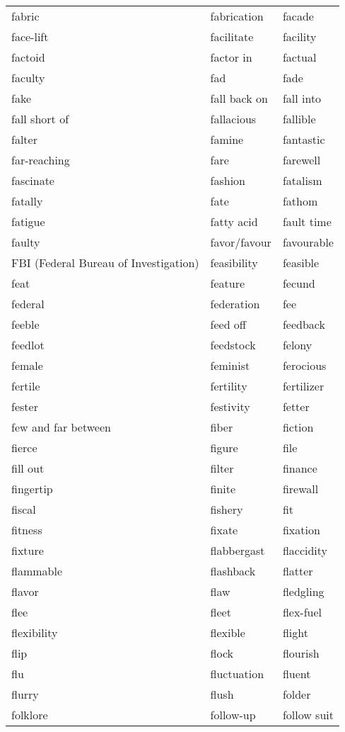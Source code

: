 \documentclass{minimal}
\begin{document}
\begin{longtable}{p{2.8cm}p{2.8cm}p{2.8cm}}
fabric & fabrication & facade \\
face-lift & facilitate & facility \\
factoid & factor in & factual \\
faculty & fad & fade \\
fake & fall back on & fall into \\
fall short of & fallacious & fallible \\
falter & famine & fantastic \\
far-reaching & fare & farewell \\
fascinate & fashion & fatalism \\
fatally & fate & fathom \\
fatigue & fatty acid & fault time \\
faulty & favor/favour & favourable \\
FBI (Federal Bureau of Investigation) & feasibility & feasible \\
feat & feature & fecund \\
federal & federation & fee \\
feeble & feed off & feedback \\
feedlot & feedstock & felony \\
female & feminist & ferocious \\
fertile & fertility & fertilizer \\
fester & festivity & fetter \\
few and far between & fiber & fiction \\
fierce & figure & file \\
fill out & filter & finance \\
fingertip & finite & firewall \\
fiscal & fishery & fit \\
fitness & fixate & fixation \\
fixture & flabbergast & flaccidity \\
flammable & flashback & flatter \\
flavor & flaw & fledgling \\
flee & fleet & flex-fuel \\
flexibility & flexible & flight \\
flip & flock & flourish \\
flu & fluctuation & fluent \\
flurry & flush & folder \\
folklore & follow-up & follow suit \\

\end{longtable}
\end{document}
